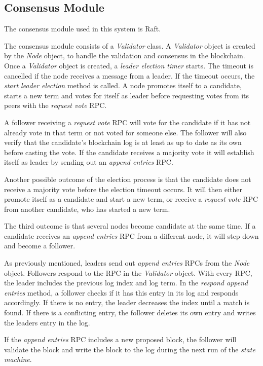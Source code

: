 
\subsection{Consensus Module}
The consensus module used in this system is Raft. 

The consensus module consists of a \textit{Validator} class. A \textit{Validator} object is created by the \textit{Node} object, to handle the validation and consensus in the blockchain. Once a \textit{Validator} object is created, a \textit{leader election timer} starts. The timeout is cancelled if the node receives a message from a leader. If the timeout occurs, the \textit{start leader election} method is called. A node promotes itself to a candidate, starts a new term and votes for itself as leader before requesting votes from its peers with the \textit{request vote} RPC. 

A follower receiving a \textit{request vote} RPC will vote for the candidate if it has not already vote in that term or not voted for someone else. The follower will also verify that the candidate's blockchain log is at least as up to date as its own before casting the vote. If the candidate receives a majority vote it will establish itself as leader by sending out an \textit{append entries} RPC. 

Another possible outcome of the election process is that the candidate does not receive a majority vote before the election timeout occurs. It will then either promote itself as a candidate and start a new term, or receive a \textit{request vote} RPC from another candidate, who has started a new term.

The third outcome is that several nodes become candidate at the same time. If a candidate receives an \textit{append entries} RPC from a different node, it will step down and become a follower. 

As previously mentioned, leaders send out \textit{append entries} RPCs from the \textit{Node} object. Followers respond to the RPC in the \textit{Validator} object. With every RPC, the leader includes the previous log index and log term. In the \textit{respond append entries} method, a follower checks if it has this entry in its log and responds accordingly. If there is no entry, the leader decreases the index until a match is found. If there is a conflicting entry, the follower deletes its own entry and writes the leaders entry in the log. 

If the \textit{append entries} RPC includes a new proposed block, the follower will validate the block and write the block to the log during the next run of the \textit{state machine}. 


